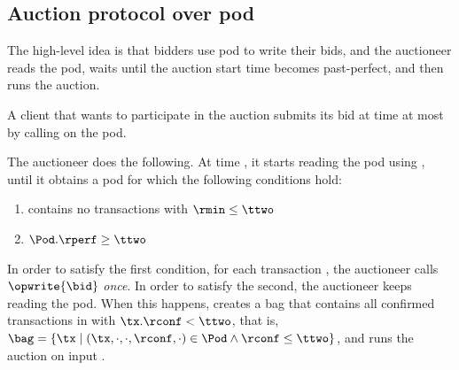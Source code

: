 \subsection{Auction protocol over pod}
The high-level idea is that bidders use pod to write their bids, and the auctioneer reads the pod, waits until the auction start time becomes past-perfect, and then runs the auction.

\begin{construction}\label{const:auction-sync}
A client that wants to participate in the auction submits its bid \bid at time at most \tone by calling \opwrite{\tx} on the pod.

The auctioneer does the following. At time \ttwo, it starts reading the pod using \opreadall{}, until it obtains a pod \Pod 
for which the following conditions hold:
        \begin{enumerate}
            \item \Pod contains no \pend transactions with $\rmin \leq \ttwo$
            \item $\Pod.\rperf \geq \ttwo$
        \end{enumerate}
In order to satisfy the first condition, for each \pend transaction \bid, the auctioneer calls $\opwrite{\bid}$ \emph{once}.
In order to satisfy the second, the auctioneer keeps reading the pod.
When this happens, \auc creates a bag \bag that contains all confirmed transactions \tx in \Pod with $\tx.\rconf < \ttwo$, that is, $\bag = \{ \tx \mid (\tx, \cdot, \cdot, \rconf, \cdot) \in \Pod \land \rconf \leq \ttwo \}$, and runs the auction on input \bag.
\end{construction}


